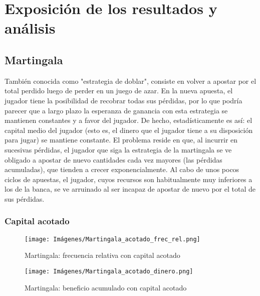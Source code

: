 \documentclass{article}
\begin{document}


\section{Exposición de los resultados y análisis}
\subsection{Martingala}
También conocida como "estrategia de doblar", consiste en volver a apostar por el total perdido luego de perder en un
juego de azar. En la nueva apuesta, el jugador tiene la posibilidad de recobrar todas sus pérdidas, por lo que podría
parecer que a largo plazo la esperanza de ganancia con esta estrategia se mantienen constantes y a favor del jugador. De
hecho, estadísticamente es así: el capital medio del jugador (esto es, el dinero que el jugador tiene a su disposición
para jugar) se mantiene constante. El problema reside en que, al incurrir en sucesivas pérdidas, el jugador que siga la
estrategia de la martingala se ve obligado a apostar de nuevo cantidades cada vez mayores (las pérdidas acumuladas),
que tienden a crecer exponencialmente. Al cabo de unos pocos ciclos de apuestas, el jugador, cuyos recursos son
habitualmente muy inferiores a los de la banca, se ve arruinado al ser incapaz de apostar de nuevo por el total de sus
pérdidas.
\newpage\subsubsection{Capital acotado}
    \begin{figure*}[!htb]
    \begin{minipage}{0.48\textwidth}
     \centering
     \texttt{[image: Imágenes/Martingala\_acotado\_frec\_rel.png]}
     \caption*{Martingala: frecuencia relativa con capital acotado}
   \end{minipage}\hfill
   \begin{minipage}{0.48\textwidth}
     \centering
     \texttt{[image: Imágenes/Martingala\_acotado\_dinero.png]}
     \caption*{Martingala: beneficio acumulado con capital acotado}
   \end{minipage}
\end{figure*}
\end{document}
